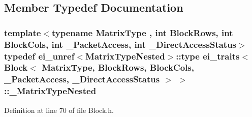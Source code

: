\subsection{Member Typedef Documentation}
\hypertarget{structei__traits_3_01_block_3_01_matrix_type_00_01_block_rows_00_01_block_cols_00_01___packet_ac479d6b4c208794fdc7c9c0ab098ad674_a1ab79ec78eb3067e7d2f5951dd745078}{
\subsubsection[{\-\_\-\-Matrix\-Type\-Nested}]{\setlength{\rightskip}{0pt plus 5cm}template$<$typename Matrix\-Type , int Block\-Rows, int Block\-Cols, int \-\_\-\-Packet\-Access, int \-\_\-\-Direct\-Access\-Status$>$ typedef {\bf ei\-\_\-unref}$<${\bf Matrix\-Type\-Nested}$>$\-::{\bf type} {\bf ei\-\_\-traits}$<$ {\bf Block}$<$ Matrix\-Type, Block\-Rows, Block\-Cols, \-\_\-\-Packet\-Access, \-\_\-\-Direct\-Access\-Status $>$ $>$\-::{\bf \-\_\-\-Matrix\-Type\-Nested}}}\label{structei__traits_3_01_block_3_01_matrix_type_00_01_block_rows_00_01_block_cols_00_01___packet_ac479d6b4c208794fdc7c9c0ab098ad674_a1ab79ec78eb3067e7d2f5951dd745078}


Definition at line 70 of file Block.\-h.

